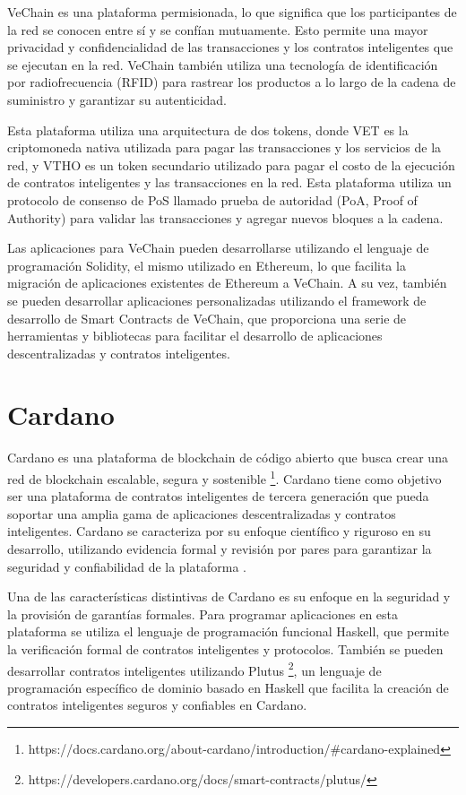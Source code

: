 \documentclass{article}
\begin{document}
VeChain es una plataforma permisionada, lo que significa que los participantes de la red se conocen entre sí y se confían mutuamente. Esto permite una mayor privacidad y confidencialidad de las transacciones y los contratos inteligentes que se ejecutan en la red. VeChain también utiliza una tecnología de identificación por radiofrecuencia (RFID) para rastrear los productos a lo largo de la cadena de suministro y garantizar su autenticidad.

Esta plataforma utiliza una arquitectura de dos tokens, donde VET es la criptomoneda nativa utilizada para pagar las transacciones y los servicios de la red, y VTHO es un token secundario utilizado para pagar el costo de la ejecución de contratos inteligentes y las transacciones en la red. Esta plataforma utiliza un protocolo de consenso de PoS llamado prueba de autoridad (PoA, Proof of Authority) para validar las transacciones y agregar nuevos bloques a la cadena.

Las aplicaciones para VeChain pueden desarrollarse utilizando el lenguaje de programación Solidity, el mismo utilizado en Ethereum, lo que facilita la migración de aplicaciones existentes de Ethereum a VeChain. A su vez, también se pueden desarrollar aplicaciones personalizadas utilizando el framework de desarrollo de Smart Contracts de VeChain, que proporciona una serie de herramientas y bibliotecas para facilitar el desarrollo de aplicaciones descentralizadas y contratos inteligentes.

\section{Cardano}

Cardano es una plataforma de blockchain de código abierto que busca crear una red de blockchain escalable, segura y sostenible \footnote{https://docs.cardano.org/about-cardano/introduction/\#cardano-explained}. Cardano tiene como objetivo ser una plataforma de contratos inteligentes de tercera generación que pueda soportar una amplia gama de aplicaciones descentralizadas y contratos inteligentes. Cardano se caracteriza por su enfoque científico y riguroso en su desarrollo, utilizando evidencia formal y revisión por pares para garantizar la seguridad y confiabilidad de la plataforma \cite{hoskinson2017we}.

Una de las características distintivas de Cardano es su enfoque en la seguridad y la provisión de garantías formales. Para programar aplicaciones en esta plataforma se utiliza el lenguaje de programación funcional Haskell, que permite la verificación formal de contratos inteligentes y protocolos. También se pueden desarrollar contratos inteligentes utilizando Plutus \cite{chakravarty2019functional}\footnote{https://developers.cardano.org/docs/smart-contracts/plutus/}, un lenguaje de programación específico de dominio basado en Haskell que facilita la creación de contratos inteligentes seguros y confiables en Cardano.
\end{document}
